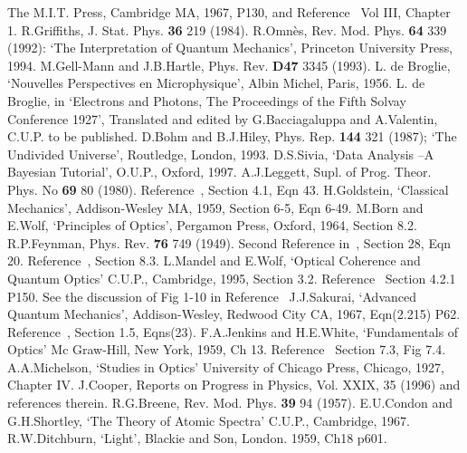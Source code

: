 {\begin{thebibliography}{99}
  The M.I.T. Press, Cambridge MA, 1967, P130, and Reference~\cite{Feyn2}
   Vol III, Chapter 1. 
  R.Griffiths, J. Stat. Phys. {\bf 36} 219 (1984).
  R.Omn\`{e}s,  Rev. Mod. Phys. {\bf 64} 339 (1992):
  `The Interpretation of Quantum Mechanics',
   Princeton University Press, 1994.
  M.Gell-Mann and J.B.Hartle, Phys. Rev. {\bf D47} 3345 (1993).
  L. de Broglie, `Nouvelles Perspectives en Microphysique',
   Albin Michel, Paris, 1956.
  L. de Broglie, in `Electrons and Photons, The Proceedings
  of the Fifth Solvay Conference 1927', Translated and edited
 by G.Bacciagaluppa and A.Valentin, C.U.P. to be
 published.
   D.Bohm and B.J.Hiley, Phys. Rep. {\bf 144} 321 (1987);
  `The Undivided Universe', Routledge, London, 1993.
 D.S.Sivia, `Data Analysis --A Bayesian Tutorial',
   O.U.P., Oxford, 1997.
  A.J.Leggett, Supl. of Prog. Theor. Phys. No {\bf 69}
  80 (1980).
 Reference~\cite{Feyn6}, Section 4.1, Eqn 43.
  H.Goldstein, `Classical Mechanics',
  Addison-Wesley MA, 1959, Section 6-5, Eqn 6-49.
    M.Born and E.Wolf, `Principles of Optics',
 Pergamon Press, Oxford, 1964, Section 8.2.
   R.P.Feynman, Phys. Rev. {\bf 76} 749 (1949).
   Second Reference in~\cite{Dirac1}, Section 28, Eqn 20.
   Reference~\cite{BW1}, Section 8.3.
 L.Mandel and E.Wolf, `Optical Coherence and
   Quantum Optics' C.U.P., Cambridge, 1995, Section 3.2.
 Reference~\cite{MW1} Section 4.2.1 P150.
  See the discussion of Fig 1-10 in 
 Reference~\cite{Feyn6}
 J.J.Sakurai, `Advanced Quantum Mechanics', Addison-Wesley,
  Redwood City CA, 1967, Eqn(2.215) P62.
 Reference~\cite{BW1}, Section 1.5, Eqns(23).
 F.A.Jenkins and H.E.White, `Fundamentals of Optics'
  Mc Graw-Hill, New York, 1959, Ch 13.
 Reference~\cite{MW1} Section 7.3, Fig 7.4.
  A.A.Michelson, `Studies in Optics' University of
   Chicago Press, Chicago, 1927, Chapter IV.
  J.Cooper, Reports on Progress in Physics,
    Vol. XXIX, 35 (1996) and references
   therein.
   R.G.Breene, Rev. Mod. Phys. {\bf 39} 94 (1957).
 E.U.Condon and G.H.Shortley, `The Theory of Atomic Spectra'
 C.U.P., Cambridge, 1967.
 R.W.Ditchburn,   `Light', Blackie  and Son, London. 1959, Ch18 p601.

\end{thebibliography}}
